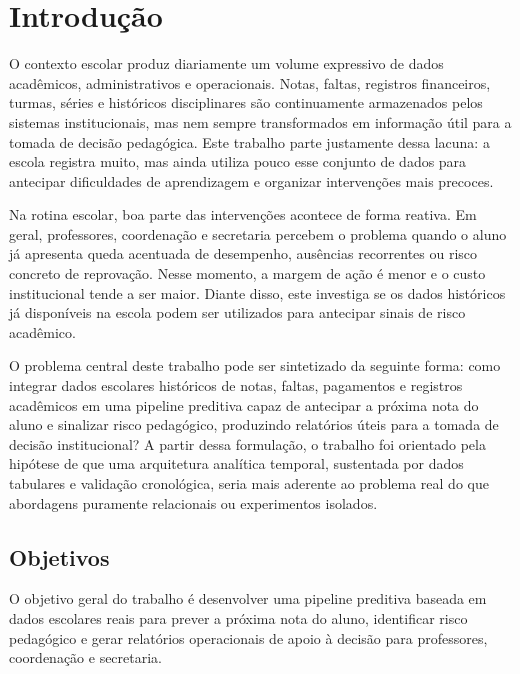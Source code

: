 \chapter{Introdu\c{c}\~ao}
\label{cap:introducao}

O contexto escolar produz diariamente um volume expressivo de dados acad\^emicos, administrativos e operacionais. Notas, faltas, registros financeiros, turmas, s\'eries e hist\'oricos disciplinares s\~ao continuamente armazenados pelos sistemas institucionais, mas nem sempre transformados em informa\c{c}\~ao \'util para a tomada de decis\~ao pedag\'ogica. Este trabalho parte justamente dessa lacuna: a escola registra muito, mas ainda utiliza pouco esse conjunto de dados para antecipar dificuldades de aprendizagem e organizar interven\c{c}\~oes mais precoces.

Na rotina escolar, boa parte das interven\c{c}\~oes acontece de forma reativa. Em geral, professores, coordena\c{c}\~ao e secretaria percebem o problema quando o aluno j\'a apresenta queda acentuada de desempenho, aus\^encias recorrentes ou risco concreto de reprova\c{c}\~ao. Nesse momento, a margem de a\c{c}\~ao \'e menor e o custo institucional tende a ser maior. Diante disso, este  investiga se os dados hist\'oricos j\'a dispon\'iveis na escola podem ser utilizados para antecipar sinais de risco acad\^emico.

O problema central deste trabalho pode ser sintetizado da seguinte forma: como integrar dados escolares hist\'oricos de notas, faltas, pagamentos e registros acad\^emicos em uma pipeline preditiva capaz de antecipar a pr\'oxima nota do aluno e sinalizar risco pedag\'ogico, produzindo relat\'orios \'uteis para a tomada de decis\~ao institucional? A partir dessa formula\c{c}\~ao, o trabalho foi orientado pela hip\'otese de que uma arquitetura anal\'itica temporal, sustentada por dados tabulares e valida\c{c}\~ao cronol\'ogica, seria mais aderente ao problema real do que abordagens puramente relacionais ou experimentos isolados.

\section{Objetivos}
\label{sec:objetivos}

O objetivo geral do trabalho \'e desenvolver uma pipeline preditiva baseada em dados escolares reais para prever a pr\'oxima nota do aluno, identificar risco pedag\'ogico e gerar relat\'orios operacionais de apoio \`a decis\~ao para professores, coordena\c{c}\~ao e secretaria.

